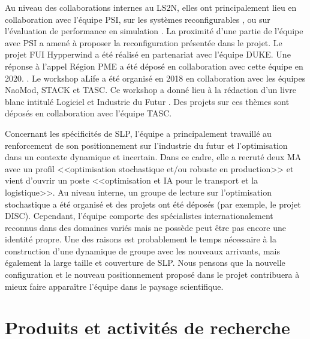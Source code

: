 Au niveau des collaborations internes au LS2N, elles ont principalement lieu en collaboration avec l'équipe PSI, sur les systèmes reconfigurables  \cite{lameche:hal-02354553, kouiss:hal-02354412}, ou sur l'évaluation de performance en simulation \cite{indriago:hal-01693153,indriago:hal-01628882}. 
La proximité d'une partie de l'équipe avec PSI a amené à proposer la reconfiguration présentée dans le projet.
Le projet FUI Hypperwind a été réalisé en partenariat avec l'équipe DUKE. Une réponse à l'appel Région PME a été déposé en collaboration avec cette équipe en 2020. . 
Le workshop aLife 
a été organisé en 2018 en collaboration avec les équipes NaoMod, STACK et TASC. 
Ce workshop a donné lieu à la rédaction d'un livre blanc intitulé Logiciel et Industrie du Futur \cite{bach:hal-02299214}. Des projets sur ces thèmes sont déposés en collaboration avec l'équipe TASC.

Concernant les spécificités de SLP, l'équipe a principalement travaillé au renforcement de son positionnement sur l'industrie du futur et l'optimisation dans un contexte dynamique et incertain. Dans ce cadre, elle a recruté deux MA avec un profil <<optimisation stochastique et/ou robuste en production>> et vient d'ouvrir un poste <<optimisation et IA pour le transport et la logistique>>. 
Au niveau interne, un groupe de lecture sur l'optimisation stochastique a été organisé et des projets ont été déposés (par exemple, le projet  DISC).
Cependant, l'équipe comporte des spécialistes internationalement reconnus dans des domaines variés mais ne possède peut être pas encore une identité propre. Une des raisons est probablement le temps nécessaire à la construction d'une dynamique de groupe avec les nouveaux arrivants, mais également la large taille et couverture de SLP. 
Nous pensons que la nouvelle configuration et le nouveau positionnement proposé dans le projet contribuera à mieux faire apparaître l'équipe dans le paysage scientifique. 



  \vfill
\rule[\baselineskip]{0pt}{\baselineskip}
 \section{Produits et activités de recherche}
 	
